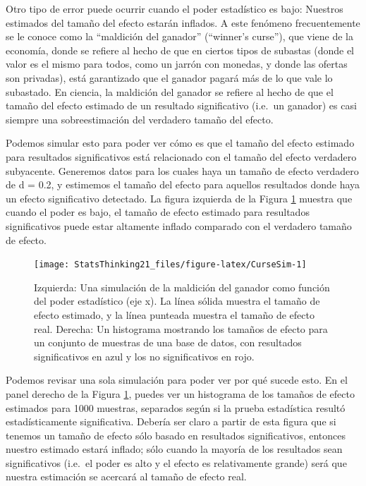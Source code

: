\documentclass[
  12pt,
]{book}
\begin{document}
Otro tipo de error puede ocurrir cuando el poder estadístico es bajo: Nuestros estimados del tamaño del efecto estarán inflados. A este fenómeno frecuentemente se le conoce como la ``maldición del ganador'' (``winner's curse''), que viene de la economía, donde se refiere al hecho de que en ciertos tipos de subastas (donde el valor es el mismo para todos, como un jarrón con monedas, y donde las ofertas son privadas), está garantizado que el ganador pagará más de lo que vale lo subastado. En ciencia, la maldición del ganador se refiere al hecho de que el tamaño del efecto estimado de un resultado significativo (i.e.~un ganador) es casi siempre una sobreestimación del verdadero tamaño del efecto.

Podemos simular esto para poder ver cómo es que el tamaño del efecto estimado para resultados significativos está relacionado con el tamaño del efecto verdadero subyacente. Generemos datos para los cuales haya un tamaño de efecto verdadero de d = 0.2, y estimemos el tamaño del efecto para aquellos resultados donde haya un efecto significativo detectado. La figura izquierda de la Figura \ref{fig:CurseSim} muestra que cuando el poder es bajo, el tamaño de efecto estimado para resultados significativos puede estar altamente inflado comparado con el verdadero tamaño de efecto.

\begin{figure}
\texttt{[image: StatsThinking21\_files/figure-latex/CurseSim-1]} \caption{Izquierda: Una simulación de la maldición del ganador como función del poder estadístico (eje x). La línea sólida muestra el tamaño de efecto estimado, y la línea punteada muestra el tamaño de efecto real. Derecha: Un histograma mostrando los tamaños de efecto para un conjunto de muestras de una base de datos, con resultados significativos en azul y los no significativos en rojo. }\label{fig:CurseSim}
\end{figure}

Podemos revisar una sola simulación para poder ver por qué sucede esto. En el panel derecho de la Figura \ref{fig:CurseSim}, puedes ver un histograma de los tamaños de efecto estimados para 1000 muestras, separados según si la prueba estadística resultó estadísticamente significativa. Debería ser claro a partir de esta figura que si tenemos un tamaño de efecto sólo basado en resultados significativos, entonces nuestro estimado estará inflado; sólo cuando la mayoría de los resultados sean significativos (i.e.~el poder es alto y el efecto es relativamente grande) será que nuestra estimación se acercará al tamaño de efecto real.
\end{document}
